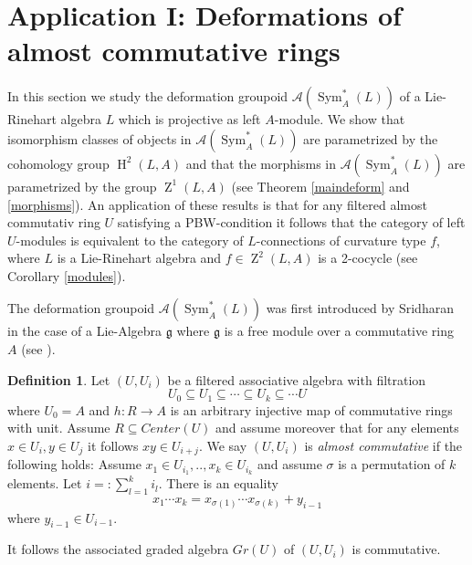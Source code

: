 \documentclass{amsart}
\theoremstyle{plain}
\theoremstyle{definition}
\newtheorem{definition}[theorem]{Definition}
\theoremstyle{remark}
\numberwithin{equation}{theorem}
\begin{document}
\section{Application I: Deformations of almost commutative rings}

In this section we study the deformation groupoid ${\mathcal{A}} ({\operatorname{Sym} }_{A}^*(L))$ of a Lie-Rinehart algebra $L$ which is 
projective as left ${A}$-module. We show that isomorphism classes of objects 
in ${\mathcal{A}} ({\operatorname{Sym} }_{A}^*(L))$ are parametrized by the cohomology
group ${\operatorname{H} }^2(L,{A})$ and that the morphisms in ${\mathcal{A}} ({\operatorname{Sym} }_{A}^*(L))$ are parametrized by the group ${\operatorname{Z}}^1(L,{A})$
(see Theorem \ref{maindeform} and \ref{morphisms}). An application of these results is that for any filtered almost
commutativ ring $U$ satisfying a PBW-condition it follows that the category of left $U$-modules is equivalent
to the category of $L$-connections of curvature type $f$, where $L$ is a Lie-Rinehart algebra and $f\in {\operatorname{Z}}^2(L,{A})$ is
a 2-cocycle (see Corollary \ref{modules}).

The deformation groupoid ${\mathcal{A}} ({\operatorname{Sym} }_{A}^*(L))$ was first introduced by Sridharan in the case of a Lie-Algebra ${\mathfrak{g}}$ 
where ${\mathfrak{g}}$ is a free module over a commutative ring $A$ (see \cite{sridharan}). 

\begin{definition}
Let $(U,U_i)$ be a filtered associative algebra with filtration
\[ U_0\subseteq U_1\subseteq \cdots \subseteq U_k \subseteq \cdots U \]
where $U_0={A}$ and $h:{R}\rightarrow {A}$ is an arbitrary injective map of commutative rings with unit. 
Assume ${R}\subseteq Center(U)$
and assume moreover that for any elements $x\in U_i, y\in U_j$ it follows
$xy\in U_{i+j}$.
We say $(U,U_i)$ is \emph{almost commutative} if the following holds: Assume 
$x_1\in U_{i_1},..,x_k\in U_{i_k}$ and  assume $\sigma$ is a permutation of $k$ elements. Let $i=:\sum_{l=1}^k i_l$.
 There is an equality
\[ x_1\cdots x_k =x_{\sigma(1)}\cdots x_{\sigma(k)}+y_{i-1} \]
where $y_{i-1}\in U_{i-1}$. 
\end{definition}

It follows the associated graded algebra $Gr(U)$ of $(U,U_i)$ is commutative.
\end{document}
